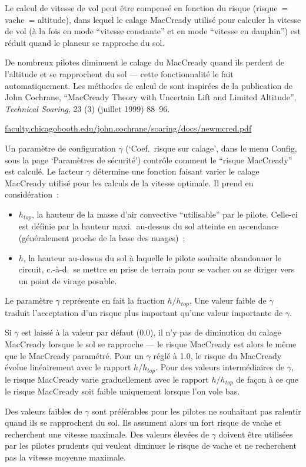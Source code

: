 Le calcul de vitesse de vol peut être compensé en fonction du risque (risque~= vache~= altitude), dans lequel le calage MacCready utilisé pour calculer la vitesse de vol (à la fois en mode ``vitesse constante'' et en mode ``vitesse en dauphin'') est réduit quand le planeur se rapproche du sol.

De nombreux pilotes diminuent le calage du MacCready quand ils perdent de l'altitude et se rapprochent du sol --- cette fonctionnalité le fait automatiquement.
Les méthodes de calcul de \xc{} sont inspirées de la publication de John Cochrane, ``MacCready Theory with Uncertain Lift and Limited Altitude'', \emph{Technical Soaring}, 23 (3) (juillet 1999) 88--96.

\url{faculty.chicagobooth.edu/john.cochrane/soaring/docs/newmcred.pdf}

Un paramètre de configuration $\gamma$ (`Coef.\ risque sur calage', dans le menu Config, sous la page `Paramètres de sécurité') contrôle comment le ``risque MacCready'' est calculé.
Le facteur $\gamma$ détermine une fonction faisant varier le calage MacCready utilisé pour les calculs de la vitesse optimale.
Il prend en considération~:
\begin{itemize}
\item $h_{top}$, la hauteur de la masse d'air convective ``utilisable'' par le pilote.
Celle-ci est définie par la hauteur maxi.\ au-dessus du sol atteinte en ascendance (généralement proche de la base des nuages)~;
\item $h$, la hauteur au-dessus du sol à laquelle le pilote souhaite abandonner le circuit, c.-à-d.\ se mettre en prise de terrain pour se vacher ou se diriger vers un point de virage posable.
\end{itemize}
Le paramètre $\gamma$ représente en fait la fraction $h/h_{top}$, Une valeur faible de $\gamma$ traduit l'acceptation d'un risque plus important qu'une valeur importante de $\gamma$.

Si $\gamma$ est laissé à la valeur par défaut (0.0), il n'y pas de diminution du calage MacCready lorsque le sol se rapproche --- le risque MacCready est alors le même que le MacCready paramétré.
Pour un $\gamma$ réglé à 1.0, le risque du MacCready évolue linéairement avec le rapport $h/h_{top}$.
Pour des valeurs intermédiaires de $\gamma$, le risque MacCready varie graduellement avec le rapport $h/h_{top}$ de façon à ce que le risque MacCready soit faible uniquement lorsque l'on vole bas.

Des valeurs faibles de $\gamma$ sont préférables pour les pilotes ne souhaitant pas ralentir quand ils se rapprochent du sol.
Ils assument alors un fort risque de vache et recherchent une vitesse maximale.
Des valeurs élevées de $\gamma$ doivent être utilisées par les pilotes prudents qui veulent diminuer le risque de vache et ne recherchent pas la vitesse moyenne maximale.

